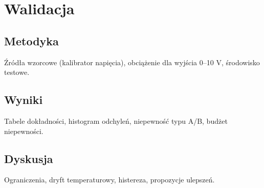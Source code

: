 \section{Walidacja}
\subsection{Metodyka}
Źródła wzorcowe (kalibrator napięcia), obciążenie dla wyjścia 0–10 V, środowisko testowe.

\subsection{Wyniki}
Tabele dokładności, histogram odchyleń, niepewność typu A/B, budżet niepewności.

\subsection{Dyskusja}
Ograniczenia, dryft temperaturowy, histereza, propozycje ulepszeń.